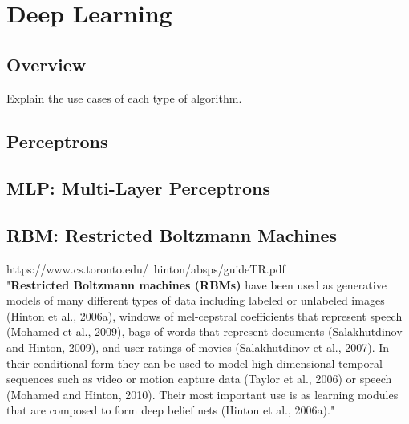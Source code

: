\section{Deep Learning}

\subsection{Overview}

Explain the use cases of each type of algorithm. 

\subsection{Perceptrons}

\subsection{MLP: Multi-Layer Perceptrons}

\subsection{RBM: Restricted Boltzmann Machines}

https://www.cs.toronto.edu/~hinton/absps/guideTR.pdf \\

"\textbf{Restricted Boltzmann machines (RBMs)} have been used as generative models of many different types of data including labeled or unlabeled images (Hinton et al., 2006a), windows of mel-cepstral coefficients that represent speech (Mohamed et al., 2009), bags of words that represent documents (Salakhutdinov and Hinton, 2009), and user ratings of movies (Salakhutdinov et al., 2007). In their conditional form they can be used to model high-dimensional temporal sequences such as video or motion capture data (Taylor et al., 2006) or speech (Mohamed and Hinton, 2010). Their most important use is as learning modules that are composed to form deep belief nets (Hinton et al., 2006a)." \\

